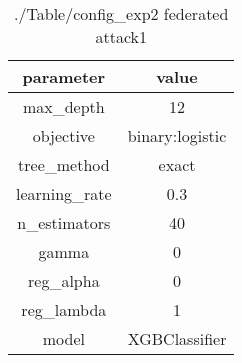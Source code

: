 \begin{table}[h]
\centering
\begin{tabular}{| c|c|}
\hline
parameter & value\\
\hline
max_depth & 12 \\\hline
objective & binary:logistic \\\hline
tree_method & exact \\\hline
learning_rate & 0.3 \\\hline
n_estimators & 40 \\\hline
gamma & 0 \\\hline
reg_alpha & 0 \\\hline
reg_lambda & 1 \\\hline
model & XGBClassifier \\\hline

\end{tabular}\caption{./Table/config_exp2 federated attack1}
\label{tab:./Table/config_exp2 federated attack1}
\end{table}
